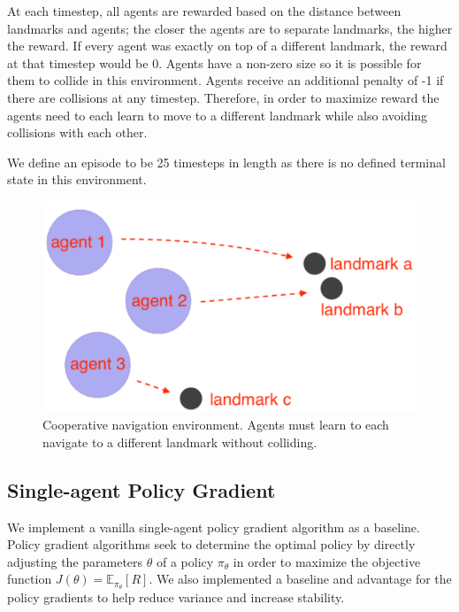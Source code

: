 \documentclass{article}
\begin{document}
At each timestep, all agents are rewarded based on the distance between landmarks and agents; the closer the agents are to separate landmarks, the higher the reward. If every agent was exactly on top of a different landmark, the reward at that timestep would be 0. Agents have a non-zero size so it is possible for them to collide in this environment. Agents receive an additional penalty of -1 if there are collisions at any timestep. Therefore, in order to maximize reward the agents need to each learn to move to a different landmark while also avoiding collisions with each other.

We define an episode to be 25 timesteps in length as there is no defined terminal state in this environment.

\begin{figure}
\begin{center}
\includegraphics[scale=0.5]{env-image}
\end{center}
\caption{Cooperative navigation environment. Agents must learn to each navigate to a different landmark without colliding.}
\end{figure}

\subsection{Single-agent Policy Gradient}
We implement a vanilla single-agent policy gradient algorithm as a baseline. Policy gradient algorithms seek to determine the optimal policy by directly adjusting the parameters $\theta$ of a policy $\pi_\theta$ in order to maximize the objective function $J(\theta) = \mathbb{E}_{\pi_\theta}[R]$. We also implemented a baseline and advantage for the policy gradients to help reduce variance and increase stability.
\end{document}
